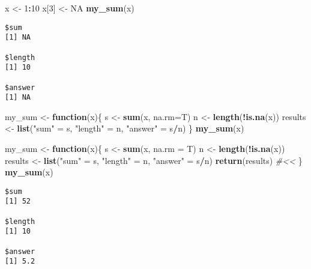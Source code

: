 \documentclass[12pt,letterpaperpaper,openany]{book}
\newenvironment{Shaded}{\begin{snugshade}}{\end{snugshade}}
\newcommand{\CommentTok}[1]{\textcolor[rgb]{0.56,0.35,0.01}{\textit{#1}}}
\newcommand{\ControlFlowTok}[1]{\textcolor[rgb]{0.13,0.29,0.53}{\textbf{#1}}}
\newcommand{\DataTypeTok}[1]{\textcolor[rgb]{0.13,0.29,0.53}{#1}}
\newcommand{\DecValTok}[1]{\textcolor[rgb]{0.00,0.00,0.81}{#1}}
\newcommand{\KeywordTok}[1]{\textcolor[rgb]{0.13,0.29,0.53}{\textbf{#1}}}
\newcommand{\NormalTok}[1]{#1}
\newcommand{\OperatorTok}[1]{\textcolor[rgb]{0.81,0.36,0.00}{\textbf{#1}}}
\newcommand{\OtherTok}[1]{\textcolor[rgb]{0.56,0.35,0.01}{#1}}
\newcommand{\StringTok}[1]{\textcolor[rgb]{0.31,0.60,0.02}{#1}}
\begin{document}
\begin{Shaded}
\begin{Highlighting}[]
\NormalTok{x <-}\StringTok{ }\DecValTok{1}\OperatorTok{:}\DecValTok{10}
\NormalTok{x[}\DecValTok{3}\NormalTok{] <-}\StringTok{ }\OtherTok{NA}
\KeywordTok{my_sum}\NormalTok{(x)}
\end{Highlighting}
\end{Shaded}

\begin{verbatim}
$sum
[1] NA

$length
[1] 10

$answer
[1] NA
\end{verbatim}

\begin{Shaded}
\begin{Highlighting}[]
\NormalTok{my_sum <-}\StringTok{ }\ControlFlowTok{function}\NormalTok{(x)\{}
\NormalTok{  s <-}\StringTok{ }\KeywordTok{sum}\NormalTok{(x, }\DataTypeTok{na.rm=}\NormalTok{T)}
\NormalTok{  n <-}\StringTok{ }\KeywordTok{length}\NormalTok{(}\OperatorTok{!}\KeywordTok{is.na}\NormalTok{(x))}
\NormalTok{  results <-}\StringTok{ }\KeywordTok{list}\NormalTok{(}\StringTok{"sum"}\NormalTok{ =}\StringTok{ }\NormalTok{s, }\StringTok{"length"}\NormalTok{ =}\StringTok{ }\NormalTok{n, }\StringTok{"answer"}\NormalTok{ =}\StringTok{ }\NormalTok{s}\OperatorTok{/}\NormalTok{n)}
\NormalTok{\}}
\KeywordTok{my_sum}\NormalTok{(x)}
\end{Highlighting}
\end{Shaded}

\begin{Shaded}
\begin{Highlighting}[]
\NormalTok{my_sum <-}\StringTok{ }\ControlFlowTok{function}\NormalTok{(x)\{}
\NormalTok{  s <-}\StringTok{ }\KeywordTok{sum}\NormalTok{(x, }\DataTypeTok{na.rm =}\NormalTok{ T)}
\NormalTok{  n <-}\StringTok{ }\KeywordTok{length}\NormalTok{(}\OperatorTok{!}\KeywordTok{is.na}\NormalTok{(x))}
\NormalTok{  results <-}\StringTok{ }\KeywordTok{list}\NormalTok{(}\StringTok{"sum"}\NormalTok{ =}\StringTok{ }\NormalTok{s, }\StringTok{"length"}\NormalTok{ =}\StringTok{ }\NormalTok{n, }\StringTok{"answer"}\NormalTok{ =}\StringTok{ }\NormalTok{s}\OperatorTok{/}\NormalTok{n)}
  \KeywordTok{return}\NormalTok{(results) }\CommentTok{#<<}
\NormalTok{\}}
\KeywordTok{my_sum}\NormalTok{(x)}
\end{Highlighting}
\end{Shaded}

\begin{verbatim}
$sum
[1] 52

$length
[1] 10

$answer
[1] 5.2
\end{verbatim}
\end{document}
